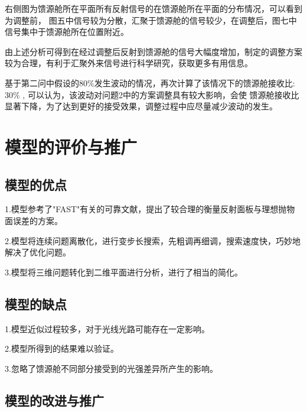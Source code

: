 \documentclass[withoutpreface,bwprint]{cumcmthesis} %
\begin{document}
右侧图为馈源舱所在平面所有反射信号的在馈源舱所在平面的分布情况，可以看到为调整前，
图五中信号较为分散，汇聚于馈源舱的信号较少，在调整后，图七中信号集中于馈源舱所在位置附近。



由上述分析可得到在经过调整后反射到馈源舱的信号大幅度增加，制定的调整方案较为合理，有利于汇聚外来信号进行科学研究，获取更多有用信息。

基于第二问中假设的80\%发生波动的情况，再次计算了该情况下的馈源舱接收比:  30\% , 可以认为，该波动对问题2中的方案调整具有较大影响，会使
馈源舱接收比显著下降，为了达到更好的接受效果，调整过程中应尽量减少波动的发生。


\hspace*{\fill}

\hspace*{\fill}

\hspace*{\fill}

\hspace*{\fill}






\section{模型的评价与推广}

\subsection{模型的优点}

1.模型参考了"FAST"有关的可靠文献，提出了较合理的衡量反射面板与理想抛物面误差的方案。

2.模型将连续问题离散化，进行变步长搜索，先粗调再细调，搜索速度快，巧妙地解决了优化问题。

3.模型将三维问题转化到二维平面进行分析，进行了相当的简化。

\subsection{模型的缺点}

1.模型近似过程较多，对于光线光路可能存在一定影响。

2.模型所得到的结果难以验证。

3.忽略了馈源舱不同部分接受到的光强差异所产生的影响。

\subsection{模型的改进与推广}
\end{document}
